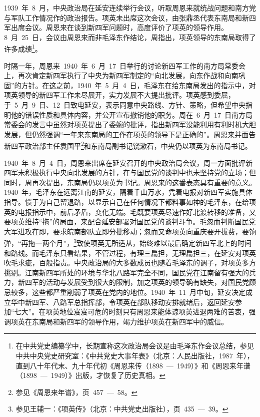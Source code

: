 1939~年~8~月，中央政治局在延安连续举行会议，听取周恩来就统战问题和南方党与军队工作情况作的政治报告。项英未出席这次会议，由张鼎丞代表东南局和新四军出席会议。周恩来在谈到新四军问题时，高度评价了项英的领导作用。8~月~25~日，会议由周恩来而非毛泽东作结论，周指出，项英领导的东南局取得了许多成绩\footnote{在中共党史编纂学中，长期宣称这次政治局会议是由毛泽东作会议总结，参见中共中央党史研究室：《中共党史大事年表》（北京：人民出版社，1987~年），直到八十年代末、九十年代初《周恩来传（1898~—~1949）》和《周恩来年谱（1898~—~1949）》出版，才恢复了历史真相。}。

时隔一年，周恩来~1940~年~6~月~17~日举行的讨论新四军工作的南方局常委会上，再次肯定新四军执行了中央为新四军制定的“向北发展，向东作战和向南巩固”的方针。在这之前，1940~年~5~月~4~日，毛泽东在给东南局发出的指示中，对项英领导的新四军工作未尽展开，实力发展不大提出批评。项英感到委屈，于~5~月~9~日、12~日致电延安，表示同意中央路线、方针、策略，但希望中央指明他的错误性质和具体内容，并公开宣布撤销他的职务。周在~6~月~17~日南方局常委会的发言中虽然对项英提出了委婉的批评，指出新四军没能利用有利时机大胆发展，但仍然强调“一年来东南局的工作在项英的领导下是正确的”。周恩来并面告新四军政治部主任袁国平\footnote{参见《周恩来年谱》，页~457~—~58。}和东南局副书记饶漱石，中央仍以项英为东南局书记。

1940~年~8~月~4~日，周恩来出席在延安召开的中央政治局会议，周一方面批评新四军未积极执行中央向北发展的方针，在与国民党的谈判中也未坚持党的立场；但同时，周再次提出，东南局仍以项英为书记。周恩来的这番表态具有重要的意义。1940~年，毛泽东在远离江南的延安，隔着千山万水，凭着电报对新四军实施具体指导。惯于为自己留退路，以显示自己在任何情况下都料事如神的毛泽东，在给项英的电报指示中，前后矛盾，变化无端。毛既要项英尽速作好北渡转移的准备，又要项英维持“拖”的局面，来配合延安部署对国民党的谈判斗争。毛忽而判断国民党大军进攻在即，要求皖南部队立即分批移动；忽而又命项英向重庆要开拔费，要饷弹，“再拖一两个月”，\footnote{参见王辅一：《项英传》（北京：中共党史出版社），页~435~—~39。}致使项英无所适从，始终难以最后确定新四军北上的时间和路线。而毛泽东只看结果，不管过程，有理三扁担，无理扁担三，在延安对项英吹毛求疵，百般指责。中央政治局的大多数成员也随着毛泽东的调子，对项英多方挑剔。江南新四军所处的环境与华北八路军完全不同，国民党在江南留有强大的兵力，新四军的活动与发展受到很大的限制，加之项英的领导确有缺失，对国民党顾忌较多，这些都严重削弱了项英在党内的地位。1940~年~11~月中旬，延安决定成立华中新四军、八路军总指挥部，令项英在部队移动安排就绪后，返回延安参加“七大”。在项英地位岌岌可危的时刻只有周恩来能体谅项英进退两难的苦衷，强调项英在东南局和新四军的领导作用，竭力维护项英在新四军中的威信。

